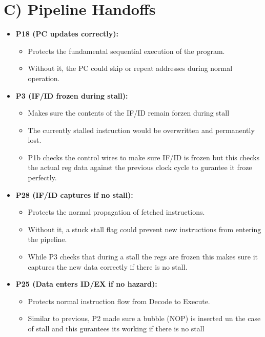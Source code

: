\documentclass[11pt]{article}
\begin{document}
\section*{C) Pipeline Handoffs}
\begin{itemize}
    \item \textbf{P18 (PC updates correctly):} 
    \begin{itemize}
        \item Protects the fundamental sequential execution of the program.
        \item Without it, the PC could skip or repeat addresses during normal operation.
    \end{itemize}

    \item \textbf{P3 (IF/ID frozen during stall):} 
    \begin{itemize}
        \item Makes sure the contents of the IF/ID remain forzen during stall
        \item The currently stalled instruction would be overwritten and permanently lost.
        \item P1b checks the control wires to make sure IF/ID is frozen but this checks the actual reg data against the previous clock cycle to gurantee it froze perfectly.
    \end{itemize}

    \item \textbf{P28 (IF/ID captures if no stall):} 
    \begin{itemize}
        \item Protects the normal propagation of fetched instructions.
        \item Without it, a stuck stall flag could prevent new instructions from entering the pipeline.
        \item While P3 checks that during a stall the regs are frozen this makes sure it captures the new data correctly if there is no stall.
    \end{itemize}

    \item \textbf{P25 (Data enters ID/EX if no hazard):} 
    \begin{itemize}
        \item Protects normal instruction flow from Decode to Execute.
        \item Similar to previous, P2 made sure a bubble (NOP) is inserted un the case of stall and this gurantees its working if there is no stall
    \end{itemize}


\end{itemize}
\end{document}
